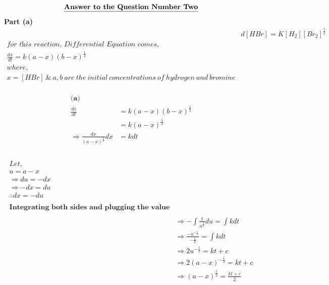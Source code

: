 \documentclass{article}
\begin{document}
\begin{homeworkProblem}
    \[      \textbf{\underline{Answer to the Question Number Two}}
    \]
    \textbf{Part (a)}
    \\
    \[
    \begin{split}
    &d[HBr] = K [H_2][Br_2]^{\frac{1}{2}}
    \\
    \textit{for this reaction, Differential Equation comes,}
    \\
    \frac{dx}{dt} = k(a-x)(b-x)^{\frac{1}{2}}
    \\
    where,
    \\
    x = [HBr] \ \& \ a,b \ are \ the \ initial \ concentrations \ of \ hydrogen \ and \ bromine
    \end{split}
    \]
    \\
    \[
    \begin{split}
        \textbf{(a)}
        \\
        \frac{dx}{dt} &= k (a-x)(b-x)^{\frac{1}{2}}
        \\
        &= k(a-x)^{\frac{3}{2}}
        \\
        \Rightarrow \frac{dx}{(a-x)^{\frac{3}{2}}} dx &= k dt
        \\
    \end{split}
    \]
    \\
    \[
    \begin{split}
        Let,\\
        u = a-x\\
        \Rightarrow du = -dx\\
        \Rightarrow -dx = du\\
        \therefore dx = -du\\\\
      \textbf{Integrating both sides and plugging the value}
      \\\\
      &\Rightarrow - \int \frac{1}{u^{\frac{3}{2}}} du = \int k dt
      \\
      &\Rightarrow \frac{-u^{-\frac{1}{2}}}{-\frac{1}{2}} = \int k dt
      \\
      &\Rightarrow 2u^{-\frac{1}{2}} = kt + c
      \\
      &\Rightarrow 2 (a-x)^{-\frac{1}{2}} = kt + c
      \\
      &\Rightarrow (a-x)^{\frac{1}{2}} = \frac{kt + c}{2}
      \\

\end{split}\]
\end{homeworkProblem}
\end{document}
